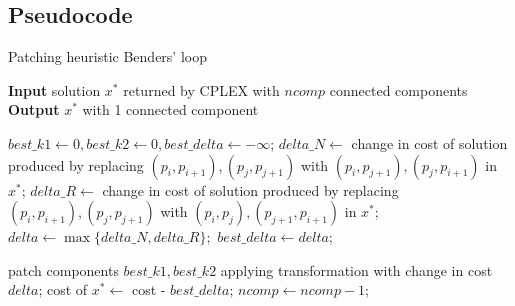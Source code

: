 \subsection{Pseudocode}
\begin{algorithm}[h]
    \caption{Patching heuristic Benders' loop}
    \hspace*{\algorithmicindent} \textbf{Input} solution $x^*$ returned by CPLEX with $ncomp$ connected components\\
    \hspace*{\algorithmicindent} \textbf{Output} $x^*$ with 1 connected component
    \begin{algorithmic}

        \State $best\_k1\leftarrow0, best\_k2\leftarrow0, best\_delta\leftarrow-\infty$;
        \State $delta\_N\leftarrow$ change in cost of solution produced by replacing
        \State $(p_i,p_{i+1}), (p_j,p_{j+1})$ with $(p_i,p_{j+1}), (p_j,p_{i+1})$ in $x^*$;
        \State $delta\_R\leftarrow$ change in cost of solution produced by replacing
        \State $(p_i,p_{i+1}), (p_j,p_{j+1})$ with $(p_i,p_j), (p_{j+1},p_{i+1})$ in $x^*$;
        \State $delta\leftarrow\max\{delta\_N,delta\_R\};$
        \State $best\_delta \leftarrow delta$;
        \EndIf
        \EndFor
        \EndFor
        \EndFor
        \EndFor

        \State patch components $best\_k1,best\_k2$ applying transformation with change in cost
        \State $delta$;
        \State cost of $x^* \leftarrow$ cost - $best\_delta$;
        \State $ncomp \leftarrow ncomp-1$;
        \EndWhile
    \end{algorithmic}
    
\end{algorithm}